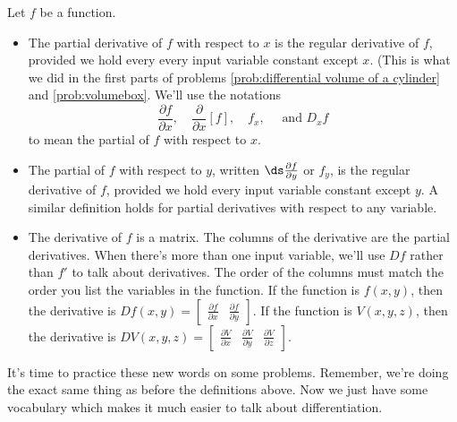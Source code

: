 \begin{dfn}
 Let $f$ be a function. 
\begin{itemize}
 \item The partial derivative of $f$ with respect to $x$ is the regular derivative of $f$, provided we hold every every input variable constant except $x$. (This is what we did in the first parts of problems \ref{prob:differential volume of a cylinder} and \ref{prob:volumebox}.  We'll use the notations
 $$
 \frac{\partial f}{\partial x}, 
 \quad \frac{\partial}{\partial x}[f],
 \quad f_x,
 \quad \text{ and }D_x f 
 $$
to mean the partial of $f$ with respect to $x$.
 \item The partial of $f$ with respect to $y$, written $\ds \frac{\partial f}{\partial y}$ or $f_y$, is the regular derivative of $f$, provided we hold every input variable constant except $y$. A similar definition holds for partial derivatives with respect to any variable.
 \item The derivative of $f$ is a matrix. The columns of the derivative are the partial derivatives. When there's more than one input variable, we'll use $Df$ rather than $f'$ to talk about derivatives.  The order of the columns must match the order you list the variables in the function. If the function is $f(x,y)$, then the derivative is 
 $Df(x,y) = \begin{bmatrix}\frac{\partial f}{\partial x}&\frac{\partial f}{\partial y}\end{bmatrix}.$
 If the function is $V(x,y,z)$, then the derivative is 
 $DV(x,y,z) = \begin{bmatrix}\frac{\partial V}{\partial x}&\frac{\partial V}{\partial y}&\frac{\partial V}{\partial z}\end{bmatrix}.$
 
\end{itemize}
\end{dfn}

It's time to practice these new words on some problems.  Remember, we're doing the exact same thing as before the definitions above. Now we just have some vocabulary which makes it much easier to talk about differentiation.

